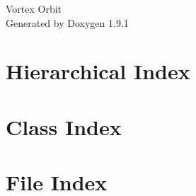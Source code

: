 \let\mypdfximage\pdfximage\def\pdfximage{\immediate\mypdfximage}\documentclass[twoside]{book}
\newcommand{\+}{\discretionary{\mbox{\scriptsize$\hookleftarrow$}}{}{}}
\newcommand{\clearemptydoublepage}{%
  \newpage{\pagestyle{empty}\cleardoublepage}%
}
\begin{document}
\raggedbottom

\hypersetup{pageanchor=false,
             bookmarksnumbered=true,
             pdfencoding=unicode
            }
\begin{titlepage}
\vspace*{7cm}
\begin{center}%
{\Large Vortex Orbit }\\
\vspace*{1cm}
{\large Generated by Doxygen 1.9.1}\\
\end{center}
\end{titlepage}
\clearemptydoublepage
{}
\tableofcontents
\clearemptydoublepage
{}
\hypersetup{pageanchor=true}

\chapter{Hierarchical Index}

\chapter{Class Index}

\chapter{File Index}

\end{document}
